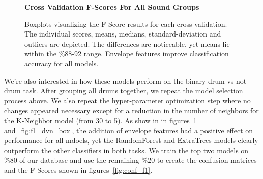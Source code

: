 \documentclass[\main/thesis.tex]{subfiles}
\begin{document}
\begin{figure}[htbp!]
    \begin{center}
    \textbf{Cross Validation F-Scores For All Sound Groups}\par\medskip
    \caption{Boxplots visualizing the F-Score results for each cross-validation. The individual scores, means, medians, standard-deviation and outliers are depicted. The differences are noticeable, yet means lie within the \%88-92 range. Envelope features improve classification accuracy for all models. }
    \label{fig:f1_allg_box}
    \end{center}

\end{figure}


We're also interested in how these models perform on the binary drum vs not drum task.
After grouping all drums together, we repeat the model selection process above. We also repeat the hyper-parameter optimization step where no changes appeared necessary except for a reduction in the number of neighbors for the K-Neighbor model (from 30 to 5). As show in in figures~\ref{fig:f1_allg_box} and~\ref{fig:f1_dvn_box}, the addition of envelope features had a positive effect on performance for all mdoels, yet the RandomForest and ExtraTrees models clearly outperform the other classifiers in both tasks. We train the top two models on \%80 of our database and use the remaining \%20 to create the confusion matrices and the F-Scores shown in figures~\ref{fig:conf_f1}.
\end{document}
